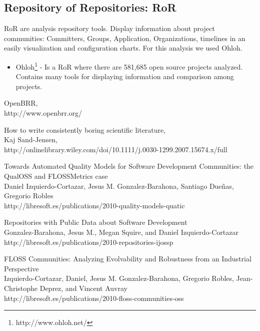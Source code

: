 \documentclass[11pt]{scrartcl}
\begin{document}
\subsection{Repository of Repositories: RoR}

RoR are analysis repository tools. Display information about project communities: Committers, Groups, Application, Organizations, timelines in an easily visualization and configuration charts. For this analysis we used Ohloh.

\begin{itemize}
    \item Ohloh\footnote{http://www.ohloh.net/} - Is a RoR where there are 581,685 open source projects analyzed. Contains many tools for displaying information and comparison among projects.
\end{itemize}

\begin{thebibliography}{9}

  OpenBRR,\\
  http://www.openbrr.org/

  How to write consistently boring scientific literature,\\
  Kaj Sand-Jensen,\\
  http://onlinelibrary.wiley.com/doi/10.1111/j.0030-1299.2007.15674.x/full

    Towards Automated Quality Models for Software Development Communities: the QualOSS and FLOSSMetrics case\\
    Daniel Izquierdo-Cortazar, Jesus M. Gonzalez-Barahona, Santiago Due\~nas, Gregorio Robles\\
    http://libresoft.es/publications/2010-quality-models-quatic

    Repositories with Public Data about Software Development\\
    Gonzalez-Barahona, Jesus M., Megan Squire, and Daniel Izquierdo-Cortazar\\
    http://libresoft.es/publications/2010-repositories-ijossp

    FLOSS Communities: Analyzing Evolvability and Robustness from an Industrial Perspective\\
    Izquierdo-Cortazar, Daniel, Jesus M. Gonzalez-Barahona, Gregorio Robles, Jean-Christophe Deprez, and Vincent Auvray\\
    http://libresoft.es/publications/2010-floss-communities-oss

\end{thebibliography}
\end{document}
